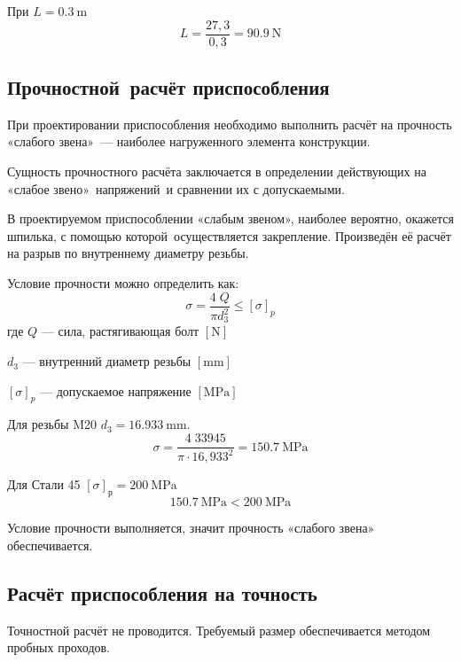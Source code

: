 \documentclass[14pt,russian,a4paper]{extreport}
\begin{document}
При $L = \SI{0,3}{\meter}$
\begin{equation*}
  L = \frac{27,3}{0,3} = \SI{90,9}{\newton}
\end{equation*}

\subsection{Прочностной расчёт приспособления}

При проектировании приспособления необходимо выполнить расчёт на прочность «слабого звена» --- наиболее нагруженного элемента конструкции.

Сущность прочностного расчёта заключается в определении действующих на «слабое звено» напряжений и сравнении их с допускаемыми.

В проектируемом приспособлении «слабым звеном», наиболее вероятно, окажется шпилька, с помощью которой осуществляется закрепление. Произведён её расчёт на разрыв по внутреннему диаметру резьбы.

Условие прочности можно определить как: \cite[форм.~14.6]{ryahovskiy:dm}
\begin{equation*}
  \sigma = \frac{4 \; Q}{\pi d_3^2} \leq \left[ \sigma \right]_p
\end{equation*}
где $Q$ --- сила, растягивающая болт $\left[\si{\newton}\right]$ \par
$d_3$ --- внутренний диаметр резьбы $\left[\si{\milli\meter}\right]$ \par
$\left[ \sigma \right]_p$ --- допускаемое напряжение $\left[\si{\mega\pascal}\right]$

Для резьбы M20 $ d_3 = \SI{16,933}{\milli\meter} $.
\begin{equation*}
  \sigma = \frac{4 \; 33945}{\pi \cdot 16,933^2} = \SI{150,7}{\mega\pascal}
\end{equation*}

Для Стали 45 $ \left[\sigma\right]_\text{р} = \SI{200}{\mega\pascal} $
\begin{equation*}
  \SI{150,7}{\mega\pascal} < \SI{200}{\mega\pascal}
\end{equation*}

Условие прочности выполняется, значит прочность «слабого звена» обеспечивается.

\subsection{Расчёт приспособления на точность}

Точностной расчёт не проводится. Требуемый размер обеспечивается методом пробных проходов.



\nocite{malvyat:okp}

\nocite{burtsev:tm2}
\nocite{bezyazichny:otm}
\nocite{blumenstejn:pto}
\nocite{kosilova:stm2}
\nocite{tarabarin:pto}
\nocite{gost:14-205-83}
\nocite{gost:3-1118-88}
\nocite{gost:2-105-95}
\nocite{gost:3-1702-79}

\printbibliography[heading=none]
\end{document}
